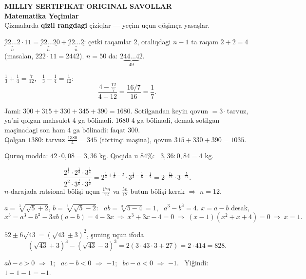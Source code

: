 


\begin{center}
{\color{msblue}\LARGE\bfseries MILLIY SERTIFIKAT ORIGINAL SAVOLLAR}\\[3pt]
{\color{msblue}\large\bfseries \curdate \qquad Matematika \qquad Yeçimlar}\\[4pt]
{\small Çizmalarda \textcolor{aux}{\bfseries qizil rangdagi} çiziqlar — yeçim uçun qöşimça yasaşlar.}
\end{center}

$\underbrace{22\ldots2}_{n}\cdot11=\underbrace{22\ldots2}_{n}0+\underbrace{22\ldots2}_{n}$: çetki raqamlar $2$, oraliqdagi $n-1$ ta raqam $2+2=4$ (masalan, $222\cdot11=2442$). $n=50$ da: $2\underbrace{44\ldots4}_{49}2$.

$\frac13+\frac14=\frac7{12}$, \ $\frac13-\frac14=\frac1{12}$:
\[\frac{4-\frac{12}7}{4+12}=\frac{16/7}{16}=\frac17.\]

Jami: $300+315+330+345+390=1680$. Sotilgandan keyin qovun $=3\cdot$tarvuz, ya'ni qolgan mahsulot $4$ ga bölinadi. $1680$ $4$ ga bölinadi, demak sotilgan maşinadagi son ham $4$ ga bölinadi: faqat $300$.\\
Qolgan $1380$: tarvuz $\frac{1380}4=345$ (törtinçi maşina), qovun $315+330+390=1035$.

Quruq modda: $42\cdot0{,}08=3{,}36$ kg. Qoqida u $84\%$: \ $3{,}36:0{,}84=4$ kg.

\[\frac{2^{\frac14}\cdot2^{\frac13}\cdot3^{\frac14}}{2^{2}\cdot3^{\frac16}\cdot3^{\frac12}}=2^{\frac14+\frac13-2}\cdot3^{\frac14-\frac16-\frac12}=2^{-\frac{17}{12}}\cdot3^{-\frac5{12}}.\]
$n$-darajada ratsional bölişi uçun $\frac{17n}{12}$ va $\frac{5n}{12}$ butun bölişi kerak $\Rightarrow$ $n=12$.

$a=\sqrt[3]{\sqrt5+2}$, $b=\sqrt[3]{\sqrt5-2}$: \ $ab=\sqrt[3]{5-4}=1$, \ $a^3-b^3=4$. $x=a-b$ desak,
\[x^3=a^3-b^3-3ab(a-b)=4-3x\ \Rightarrow\ x^3+3x-4=0\ \Rightarrow\ (x-1)(x^2+x+4)=0\ \Rightarrow\ x=1.\]

$52\pm6\sqrt{43}=(\sqrt{43}\pm3)^2$, şuning uçun ifoda
\[(\sqrt{43}+3)^3-(\sqrt{43}-3)^3=2\left(3\cdot43\cdot3+27\right)=2\cdot414=828.\]

$ab-c>0$ $\Rightarrow$ $1$; \ $ac-b<0$ $\Rightarrow$ $-1$; \ $bc-a<0$ $\Rightarrow$ $-1$. \ Yiğindi: $1-1-1=-1$.

